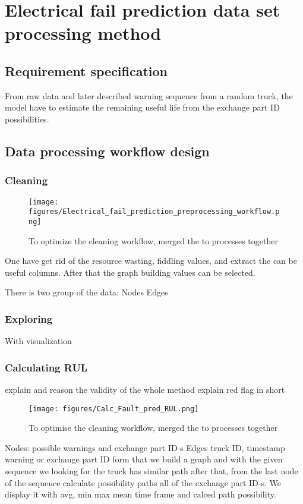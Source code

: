\section{Electrical fail prediction data set processing method}
	\subsection{Requirement specification}
From raw data and later described warning sequence from a random truck, the model have to estimate the remaining useful life from the exchange part ID possibilities.	
	\subsection{Data processing workflow design}
\cite{BALNWSCBOOK}
\cite{CSDISTILLED}
\cite{DATACAMP}
\cite{LeanThinking}
		\subsubsection{Cleaning}
		\begin{figure}[!ht]
		\centering
		\texttt{[image: figures/Electrical\_fail\_prediction\_preprocessing\_workflow.png]}
		\caption{To optimize the cleaning workflow, merged the to processes together} 
		\end{figure}
		One have get rid of the resource wasting, fiddling values, and extract the can be useful columns. After that the graph building values can be selected.

		There is two group of the data:
		Nodes
		Edges

		\subsubsection{Exploring}
		With visualization
		\subsubsection{Calculating RUL}
explain and reason the validity of the whole method
		explain red flag in short
		\begin{figure}[!ht]
		\centering
		\texttt{[image: figures/Calc\_Fault\_pred\_RUL.png]}
		\caption{To optimise the cleaning workflow, merged the to processes together} 
		\end{figure}
		Nodes: possible warnings and exchange part ID-s
		Edges truck ID, timestamp warning or exchange part ID
		form that we build a graph and with the given sequence we looking for the truck has similar path after that, from the last node of the sequence calculate possibility paths all of the exchange part ID-s. We display it with avg, min max mean time frame and calced path possibility.
